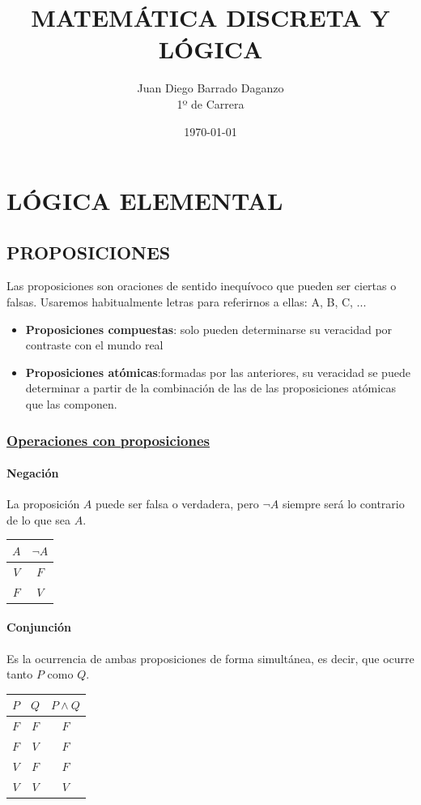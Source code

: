 \documentclass[10pt,a4paper,openright]{book}
\title{MATEMÁTICA DISCRETA Y LÓGICA}
\author{Juan Diego Barrado Daganzo\\1º de Carrera} %
\date{\today}
\begin{document}
\maketitle

\mainmatter
\chapter*{LÓGICA ELEMENTAL}
\section*{PROPOSICIONES}
Las proposiciones son oraciones de sentido inequívoco que pueden ser ciertas o falsas. Usaremos habitualmente letras para referirnos a ellas: A, B, C, ...

\begin{itemize}
\item \textbf{Proposiciones compuestas}: solo pueden determinarse su veracidad por contraste con el mundo real
\item \textbf{Proposiciones atómicas}:formadas por las anteriores, su veracidad se puede determinar a partir de la combinación de las de las proposiciones atómicas que las componen.
\end{itemize}

\subsection*{\underline{Operaciones con proposiciones}}
\subsubsection*{Negación}
La proposición $A$ puede ser falsa o verdadera, pero $\neg A$ siempre será lo contrario de lo que sea $A$.
\begin{center}
 \begin{tabular}{|c|c|} 
   \hline
     $A$ & $\neg A$ \\ [0.5ex] 
   \hline \hline
     $V$ & $F$ \\
   \hline 
     $F$ & $V$ \\
   \hline
 \end{tabular}
\end{center}

\subsubsection*{Conjunción}
Es la ocurrencia de ambas proposiciones de forma simultánea, es decir, que ocurre tanto $P$ como $Q$.
\begin{center}
 \begin{tabular}{ |c|c|c| } 
   \hline
     $P$ & $Q$ & $P \wedge Q$ \\ [0.5ex] 
   \hline \hline
     $F$ & $F$ & $F$ \\
   \hline 
     $F$ & $V$ & $F$ \\
   \hline
     $V$ & $F$ & $F$ \\
   \hline
     $V$ & $V$ & $V$ \\
   \hline
 \end{tabular}
\end{center}
\end{document}
